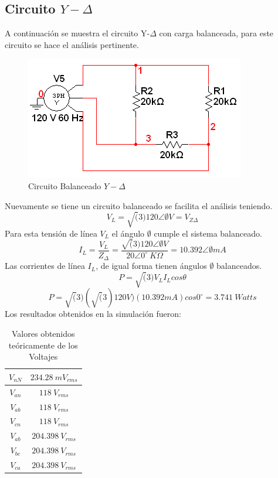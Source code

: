 \documentclass[twocolumn]{IEEEtran}
\begin{document}
\subsection{Circuito $Y-\Delta$}
\noindent
A continuación se muestra el circuito Y-$\Delta$ con carga balanceada, para este circuito se hace el análisis pertinente.
\begin{figure}[H]
	\centering
		\includegraphics[scale=0.7]{circYD.PNG}
	\caption{Circuito Balanceado $Y-\Delta$}
	\label{fig2}
\end{figure}
\noindent
Nuevamente se tiene un circuito balanceado se facilita el análisis teniendo.
\begin{equation}
 V_L = \sqrt(3)120 \angle \emptyset V =V_{Z\Delta}
 \label{ecu3}
\end{equation}
\noindent
Para esta tensión de línea $V_L$ el ángulo $\emptyset$ cumple el sistema balanceado.
\begin{equation}
 I_L =\frac{V_L}{Z_{\Delta}}=\frac{\sqrt(3)120 \angle \emptyset V}{20 \angle 0^\circ\ K \Omega}=10.392\angle \emptyset mA
 \label{ecu4}
\end{equation}
\noindent
Las corrientes de línea $I_L$, de igual forma tienen ángulos $\emptyset$ balanceados.
\begin{equation}
 P = \sqrt(3)  V_L  I_L  cos \theta
\label{ecu5}
\end{equation}
\begin{equation}
 P =\sqrt(3)(\sqrt(3)120 V)(10.392 mA)cos 0^\circ = 3.741\ Watts
\label{ecu6}
\end{equation}
\noindent
Los resultados obtenidos en la simulación fueron:
\begin{table}[H]
	\centering
\begin{tabular}[c]{|c|c|} \hline
$V_{nN}$ & $234.28 \ mV_{rms}$ \\ \hline
$V_{an}$ & $118 \ V_{rms}$ \\ \hline
$V_{ab}$ & $118 \ V_{rms}$ \\ \hline
$V_{cn}$ & $118 \ V_{rms}$ \\ \hline
$V_{ab}$ & $204.398 \ V_{rms}$ \\ \hline
$V_{bc}$ & $204.398 \ V_{rms}$ \\ \hline
$V_{ca}$ & $204.398 \ V_{rms}$ \\ \hline
\end{tabular}
	\caption{Valores obtenidos teóricamente  de los Voltajes}
	\label{tab12}
\end{table}
\end{document}

